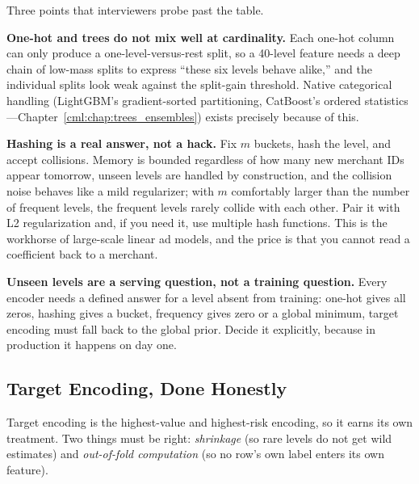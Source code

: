 Three points that interviewers probe past the table.

\textbf{One-hot and trees do not mix well at cardinality.} Each one-hot column can only produce a one-level-versus-rest split, so a 40-level feature needs a deep chain of low-mass splits to express ``these six levels behave alike,'' and the individual splits look weak against the split-gain threshold. Native categorical handling (LightGBM's gradient-sorted partitioning, CatBoost's ordered statistics---Chapter~\ref{cml:chap:trees_ensembles}) exists precisely because of this.

\textbf{Hashing is a real answer, not a hack.} Fix $m$ buckets, hash the level, and accept collisions. Memory is bounded regardless of how many new merchant IDs appear tomorrow, unseen levels are handled by construction, and the collision noise behaves like a mild regularizer; with $m$ comfortably larger than the number of frequent levels, the frequent levels rarely collide with each other. Pair it with L2 regularization and, if you need it, use multiple hash functions. This is the workhorse of large-scale linear ad models, and the price is that you cannot read a coefficient back to a merchant.

\textbf{Unseen levels are a serving question, not a training question.} Every encoder needs a defined answer for a level absent from training: one-hot gives all zeros, hashing gives a bucket, frequency gives zero or a global minimum, target encoding must fall back to the global prior. Decide it explicitly, because in production it happens on day one.

\subsection{Target Encoding, Done Honestly}

Target encoding is the highest-value and highest-risk encoding, so it earns its own treatment. Two things must be right: \emph{shrinkage} (so rare levels do not get wild estimates) and \emph{out-of-fold computation} (so no row's own label enters its own feature).

